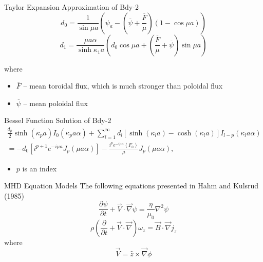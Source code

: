 \documentclass{beamer}
\newcommand{\lr}[1]{\left(#1\right)}
\newcommand{\lrsq}[1]{\left[ #1 \right]}
\newcommand{\lra}[1]{\left\langle #1 \right\rangle}
\newcommand{\besj}[2]{J_{#1}\lr{#2}}
\newcommand{\besi}[2]{I_{#1}\lr{#2}}
\begin{document}
\begin{frame}[t]
\begin{textblock}{15}
\begin{block}{Taylor Expansion Approximation of Bdy-2}
\begin{equation}
    d_0=\frac{1}{\sin{\mu a}} \lr{\psi_a - \lr{\overline{\psi} + \frac{\overline{F}}{\mu}}(1-\cos{\mu a})}
\end{equation} 
\begin{equation}
d_1=\frac{\mu a \alpha}{\sinh{\kappa_1 a}}\lr{d_0\cos{\mu a} + \lr{\frac{\overline{F}}{\mu}    + \overline{\psi}}\sin{\mu a}}
\end{equation} 

where
\begin{itemize}
    \item $\overline{F}$ -- mean toroidal flux, which is much stronger than poloidal flux
    \item $\overline{\psi}$ -- mean poloidal flux
\end{itemize}

\end{block}
\begin{block}{Bessel Function Solution of Bdy-2}
\begin{multline}
        \frac{d_p}{2}\sinh\lr{\kappa_p a}\besi{0}{\kappa_p a \alpha}+\sum_{l=1}^{\infty}d_l\lrsq{\sinh\lr{\kappa_l a}-\cosh\lr{\kappa_l a}}\besi{l-p}{\kappa_l a \alpha}\\
        = -d_0\left[i^{p+1}e^{-i\mu a}\besj{p}{\mu a \alpha}\right]-\frac{i^p e^{-i\mu a}\lra{F_0}}{\mu}\besj{p}{\mu a \alpha},\label{eq2.42}
\end{multline}
\begin{itemize}
    \item $p$ is an index
\end{itemize}
    
\end{block}

\begin{block}{MHD Equation Models}
    The following equations presented in Hahm and Kulsrud (1985) \cite{hahmkulsrud}
\begin{equation}
    \label{eq:hk15}
    \frac{\partial \psi}{\partial t} + \vec{V}\cdot \vec{\nabla} \psi= \frac{\eta}{\mu_0} \nabla ^2 \psi
\end{equation} 
\begin{equation}
    \label{eq:hk16}
    \rho\left( \frac{\partial }{\partial t} + \vec{V}\cdot \vec{\nabla} \right)\omega_z = \vec{B}\cdot \vec{\nabla}j_z
\end{equation} 
where
\begin{equation}
    \vec{V}= \hat{z}\times \vec{\nabla}\phi
\end{equation} 


\end{block}
\end{textblock}
\end{frame}
\end{document}
